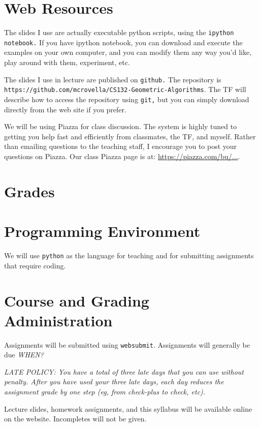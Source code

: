 \documentclass[11pt]{article}
\begin{document}
\section*{Web Resources} 

The slides I use are actually executable python scripts, using the
\texttt{ipython notebook.}   If you have ipython notebook, you can
download and execute the examples on your own computer, and you can
modify them any way you'd like, play around with them, experiment, etc.

The slides I use in lecture are published on \texttt{github.}   The
repository is
\texttt{https://github.com/mcrovella/CS132-Geometric-Algorithms}.  The TF
will describe how to access the repository using \texttt{git,} but you
can simply download directly from the web site if you prefer.
 
We will be using Piazza for class discussion. The system is highly
tuned to getting you help fast and efficiently from classmates, the
TF, and myself. Rather than emailing questions to the teaching staff,
I encourage you to post your questions on Piazza.   Our class Piazza
page  is at: \url{https://piazza.com/bu/...}. 

\section*{Grades}

\section*{Programming Environment}

We will use \texttt{python} as the language for teaching and for
submitting assignments that require coding.



\section*{Course and Grading Administration}


Assignments will be submitted using \texttt{websubmit}.   Assignments will
generally be due \emph{WHEN?}

\emph{LATE POLICY: You have a total of three late days that you can use without penalty.
After you have used your three late days, each day reduces the
assignment grade by one step (eg, from check-plus to check, etc).}

\sloppypar
Lecture slides, homework assignments, and this syllabus will be available
online on the website.  Incompletes will not be given. 
\end{document}
